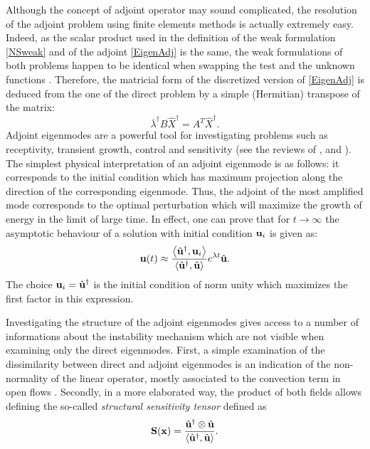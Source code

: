 \documentclass[twocolumn,10pt]{asme2ej}
\newcommand{\be}[1]{ \begin{equation} \label{#1}}
\newcommand{\ee}{\end{equation}}
\begin{document}
Although the concept of adjoint operator may sound complicated, the resolution of the adjoint problem using finite elements methods is actually extremely easy.
Indeed, as the scalar product used in the definition of the weak formulation \eqref{NSweak} and of the adjoint \eqref{EigenAdj} is the same, the weak formulations of both problems happen to be identical when swapping the test and the unknown functions .
Therefore, the matricial form of the discretized version of \eqref{EigenAdj} is deduced from the one of the direct problem by a simple (Hermitian) transpose of the matrix:
\be{Eigen_Adj_matricial}
\overline{\lambda}^\dag B \hat{X}^\dag = A^T \hat{X}^\dag.
\ee
Adjoint eigenmodes are a powerful tool for investigating problems such as receptivity, transient growth, control and sensitivity (see the reviews of \cite{Jmc2005}, \cite{Ps2007} and \cite{LucBott2014}). The simplest physical interpretation of an adjoint eigenmode is as follows: it corresponds to the initial condition which has maximum projection along the direction of the corresponding eigenmode.
Thus, the adjoint of the most amplified mode corresponds to the optimal perturbation which will maximize the growth of energy in the limit of large time. In effect, one can prove that for $t \rightarrow \infty$  the asymptotic behaviour of a solution with initial condition ${\bf u}_i$  is given as:
$$
{\bf u}(t) \approx 
\frac{ \left< \hat{\bf u}^\dag, {\bf u}_i\right>}{\left<\hat{\bf u}^\dag, \hat{\bf u}\right>} 
e^{\lambda t} \hat{\bf u}.
$$
The choice ${\bf u}_i = \hat{\bf u}^\dag$ is the initial condition of norm unity which maximizes the first factor in this expression.

Investigating the structure of the adjoint eigenmodes gives access to a number of informations about the instability mechanism which are not visible when examining only the direct eigenmodes. First, a simple examination of the dissimilarity between direct and adjoint eigenmodes is an indication of the non-normality of the linear operator, mostly associated to the convection term in open flows \cite{Jmc2005}. Secondly, in a more elaborated way, the product of both fields allows defining the so-called {\em structural sensitivity tensor } defined as 
\be{StructurrTens} 
{\bf{S}}({\bf{x}}) = \frac{ \hat{\bf u}^\dag \otimes \hat{\bf u} }{{\left<\hat{\bf u}^\dag, \hat{\bf u}\right>}}.
\ee 
\end{document}
